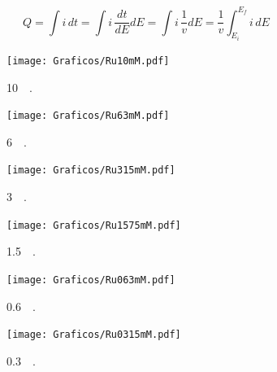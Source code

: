 			\begin{equation}
					Q=\int i\,dt = \int i\, \frac{dt}{dE} dE = \int i\,\frac{1}{v}dE=\frac{1}{v}\int_{E_{i}}^{E_{f}} i\,dE
					\label{eq:carga}
			\end{equation}

			\begin{figure}[b!]
			   	    \begin{subfigure}[t]{0.325\textwidth}
			        	\texttt{[image: Graficos/Ru10mM.pdf]}
			        	\vspace*{-0.40cm}\caption{\aminorutenio\space \SI{10}{\milli\Molar}.}
			         	\label{fig:Ru10mM}
			     		\end{subfigure}
			   	    \begin{subfigure}[t]{0.325\textwidth}
			        	\texttt{[image: Graficos/Ru63mM.pdf]}
			       		\vspace*{-0.40cm}\caption{\aminorutenio\space \SI{6}{\milli\Molar}.}
			         	\label{fig:Ru63mM}
			     		\end{subfigure}
		     		\begin{subfigure}[t]{0.325\textwidth}
			        	\texttt{[image: Graficos/Ru315mM.pdf]}
			       		\vspace*{-0.40cm}\caption{\aminorutenio\space \SI{3}{\milli\Molar}.}
			         	\label{fig:Ru315mM}
			     		\end{subfigure}
		     		\begin{subfigure}[t]{0.325\textwidth}
			        	\texttt{[image: Graficos/Ru1575mM.pdf]}
			       		\vspace*{-0.40cm}\caption{\aminorutenio\space \SI{1.5}{\milli\Molar}.}
			         	\label{fig:Ru1575M}
			     		\end{subfigure}
		 	   	   	\begin{subfigure}[t]{0.325\textwidth}
			        	\texttt{[image: Graficos/Ru063mM.pdf]}
			       		\vspace*{-0.40cm}\caption{\aminorutenio\space \SI{0.6}{\milli\Molar}.}
			         	\label{fig:Ru063mM}
			     		\end{subfigure}
		     		\begin{subfigure}[t]{0.325\textwidth}
			        	\texttt{[image: Graficos/Ru0315mM.pdf]}
			       		\vspace*{-0.40cm}\caption{\aminorutenio\space \SI{0.3}{\milli\Molar}.}
			         	\label{fig:Ru0315mM}
			     		\end{subfigure}
			     	 \begin{subfigure}[t]{0.325\textwidth}

\end{subfigure}
\end{figure}
